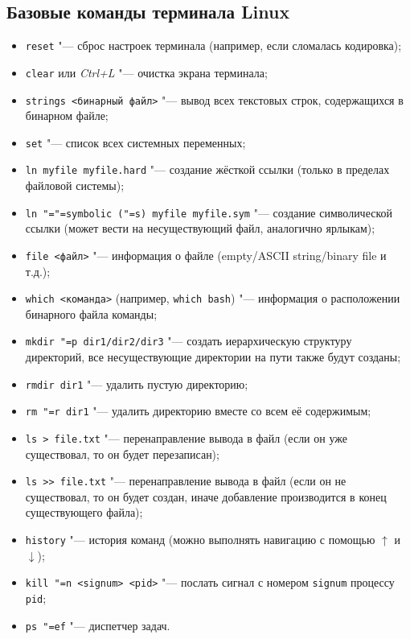 \subsection{Базовые команды терминала Linux}

\begin{itemize}
	\item \texttt{reset} "--- сброс настроек терминала (например, если сломалась кодировка);
	\item \texttt{clear} или \textit{Ctrl+L} "--- очистка экрана терминала;
	\item \texttt{strings <бинарный файл>} "--- вывод всех текстовых строк, содержащихся в бинарном файле;
	\item \texttt{set} "--- список всех системных переменных;
	\item \texttt{ln myfile myfile.hard} "--- создание жёсткой ссылки (только в пределах файловой системы);
	\item \texttt{ln "="=symbolic ("=s) myfile myfile.sym} "--- создание символической ссылки (может вести на несуществующий файл, аналогично ярлыкам);
	\item \texttt{file <файл>} "--- информация о файле (empty/ASCII string/binary file и т.д.);
	\item \texttt{which <команда>} (например, \texttt{which bash}) "--- информация о расположении бинарного файла команды;
	\item \texttt{mkdir "=p dir1/dir2/dir3} "--- создать иерархическую структуру директорий, все несуществующие директории на пути также будут созданы;
	\item \texttt{rmdir dir1} "--- удалить пустую директорию;
	\item \texttt{rm "=r dir1} "--- удалить директорию вместе со всем её содержимым;
	\item \texttt{ls {>} file.txt} "--- перенаправление вывода в файл (если он уже существовал, то он будет перезаписан);
	\item \texttt{ls {>}{>} file.txt} "--- перенаправление вывода в файл (если он не существовал, то он будет создан, иначе добавление производится в конец существующего файла);
	\item \texttt{history} "--- история команд (можно выполнять навигацию с помощью $\uparrow$ и $\downarrow$);
	\item \texttt{kill "=n <signum> <pid>} "--- послать сигнал с номером \texttt{signum} процессу \texttt{pid};
	\item \texttt{ps "=ef} "--- диспетчер задач.
\end{itemize}

